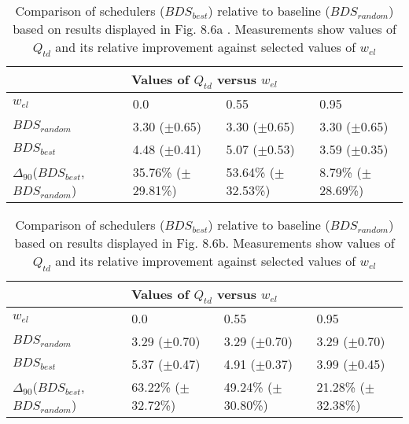 \clearpage
\begin{landscape}
\begin{table}[h]
\begin{center}
\begin{tabular}{llll}
\toprule
\multicolumn{4}{c}{Values of $Q_{td}$ versus $w_{el}$}\\
\midrule
$w_{el}$ & 0.0 & 0.55 & 0.95\\
\midrule
$BDS_{random}$ &  3.30 ($\pm$0.65) &  3.30 ($\pm$0.65) &  3.30 ($\pm$0.65)\\
\midrule
$BDS_{best}$ &  4.48 ($\pm$0.41) &  5.07 ($\pm$0.53) &  3.59 ($\pm$0.35)\\
$\Delta_{90}$($BDS_{best}$,$BDS_{random}$) & 35.76\% ($\pm$29.81\%) & 53.64\% ($\pm$32.53\%) & 8.79\% ($\pm$28.69\%)\\
\bottomrule
\end{tabular}
\end{center}
\caption[Comparison of $Q_{td}$ versus $w_{el}$ for $BDS_{best}$ relative to $BDS_{random}$.]{Comparison of schedulers ($BDS_{best}$) relative to baseline ($BDS_{random}$) based on results displayed in Fig. 8.6a . Measurements show values of $Q_{td}$ and its relative improvement against selected values of $w_{el}$}
\label{b:f86a}
\end{table}
\end{landscape}


\clearpage
\begin{landscape}
\begin{table}[h]
\begin{center}
\begin{tabular}{llll}
\toprule
\multicolumn{4}{c}{Values of $Q_{td}$ versus $w_{el}$}\\
\midrule
$w_{el}$ & 0.0 & 0.55 & 0.95\\
\midrule
$BDS_{random}$ &  3.29 ($\pm$0.70) &  3.29 ($\pm$0.70) &  3.29 ($\pm$0.70)\\
\midrule
$BDS_{best}$ &  5.37 ($\pm$0.47) &  4.91 ($\pm$0.37) &  3.99 ($\pm$0.45)\\
$\Delta_{90}$($BDS_{best}$,$BDS_{random}$) & 63.22\% ($\pm$32.72\%) & 49.24\% ($\pm$30.80\%) & 21.28\% ($\pm$32.38\%)\\
\bottomrule
\end{tabular}
\end{center}
\caption[Comparison of $Q_{td}$ versus $w_{el}$ for $BDS_{best}$ relative to $BDS_{random}$.]{Comparison of schedulers ($BDS_{best}$) relative to baseline ($BDS_{random}$) based on results displayed in Fig. 8.6b. Measurements show values of $Q_{td}$ and its relative improvement against selected values of $w_{el}$}
\label{b:f86b}
\end{table}
\end{landscape}


